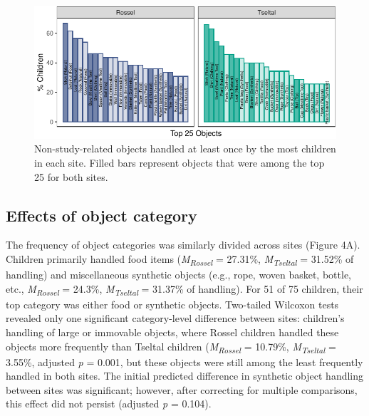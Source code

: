 \documentclass[10pt, letterpaper]{article}
\newenvironment{CodeChunk}{}{}
\begin{document}
\begin{CodeChunk}
\begin{figure}[!ht]

{\centering \includegraphics{figs/top-objects-fig-1} 

}

\caption[Non-study-related objects handled at least once by the most children in each site]{Non-study-related objects handled at least once by the most children in each site. Filled bars represent objects that were among the top 25 for both sites.}\label{fig:top-objects-fig}
\end{figure}
\end{CodeChunk}

\hypertarget{effects-of-object-category}{%
\subsection{Effects of object
category}\label{effects-of-object-category}}

The frequency of object categories was similarly divided across sites
(Figure 4A). Children primarily handled food items
(\emph{M}\textsubscript{\emph{Rossel}} = 27.31\%,
\emph{M}\textsubscript{\emph{Tseltal}} = 31.52\% of handling) and
miscellaneous synthetic objects (e.g., rope, woven basket, bottle, etc.,
\emph{M}\textsubscript{\emph{Rossel}} = 24.3\%,
\emph{M}\textsubscript{\emph{Tseltal}} = 31.37\% of handling). For 51 of
75 children, their top category was either food or synthetic objects.
Two-tailed Wilcoxon tests revealed only one significant category-level
difference between sites: children's handling of large or immovable
objects, where Rossel children handled these objects more frequently
than Tseltal children (\emph{M}\textsubscript{\emph{Rossel}} = 10.79\%,
\emph{M}\textsubscript{\emph{Tseltal}} = 3.55\%, adjusted \emph{p} =
0.001, but these objects were still among the least frequently handled
in both sites. The initial predicted difference in synthetic object
handling between sites was significant; however, after correcting for
multiple comparisons, this effect did not persist (adjusted \emph{p} =
0.104).
\end{document}
